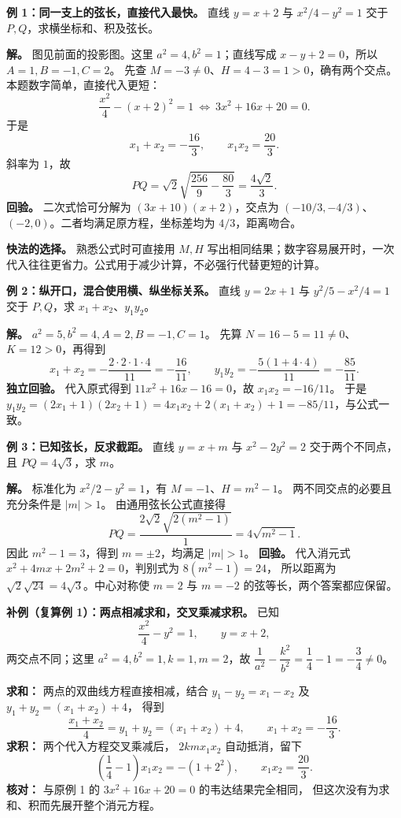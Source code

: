 \begin{examplebox}
\textbf{例 1：同一支上的弦长，直接代入最快。}
直线 $y=x+2$ 与 $x^2/4-y^2=1$ 交于 $P,Q$，求横坐标和、积及弦长。

\textbf{解。} 图见前面的投影图。这里 $a^2=4,b^2=1$；直线写成 $x-y+2=0$，所以 $A=1,B=-1,C=2$。
先查 $M=-3\ne0$、$H=4-3=1>0$，确有两个交点。
本题数字简单，直接代入更短：
\[
 \frac{x^2}{4}-(x+2)^2=1
 \ \Longleftrightarrow\ 3x^2+16x+20=0.
\]
于是
\[
 x_1+x_2=-\frac{16}{3},\qquad x_1x_2=\frac{20}{3}.
\]
斜率为 $1$，故
\[
 PQ=\sqrt2\sqrt{\frac{256}{9}-\frac{80}{3}}
 =\boxed{\frac{4\sqrt2}{3}}.
\]
\textbf{回验。} 二次式恰可分解为 $(3x+10)(x+2)$，交点为
$(-10/3,-4/3)$、$(-2,0)$。二者均满足原方程，坐标差均为 $4/3$，距离吻合。

\textbf{快法的选择。} 熟悉公式时可直接用 $M,H$ 写出相同结果；数字容易展开时，一次代入往往更省力。公式用于减少计算，不必强行代替更短的计算。
\end{examplebox}
\clearpage
\begin{examplebox}
\textbf{例 2：纵开口，混合使用横、纵坐标关系。}
直线 $y=2x+1$ 与 $y^2/5-x^2/4=1$ 交于 $P,Q$，求 $x_1+x_2$、$y_1y_2$。

\textbf{解。} $a^2=5,b^2=4,A=2,B=-1,C=1$。
先算 $N=16-5=11\ne0$、$K=12>0$，再得到
\[
 x_1+x_2=-\frac{2\cdot2\cdot1\cdot4}{11}=\boxed{-\frac{16}{11}},
\qquad y_1y_2=-\frac{5(1+4\cdot4)}{11}=\boxed{-\frac{85}{11}}.
\]
\textbf{独立回验。} 代入原式得到 $11x^2+16x-16=0$，故 $x_1x_2=-16/11$。
于是 $y_1y_2=(2x_1+1)(2x_2+1)=4x_1x_2+2(x_1+x_2)+1=-85/11$，与公式一致。
\end{examplebox}
\clearpage
\begin{examplebox}
\textbf{例 3：已知弦长，反求截距。}
直线 $y=x+m$ 与 $x^2-2y^2=2$ 交于两个不同点，且 $PQ=4\sqrt3$，求 $m$。

\textbf{解。} 标准化为 $x^2/2-y^2=1$，有 $M=-1$、$H=m^2-1$。
两不同交点的必要且充分条件是 $|m|>1$。
由通用弦长公式直接得
\[
 PQ=\frac{2\sqrt2\sqrt{2(m^2-1)}}1=4\sqrt{m^2-1}.
\]
因此 $m^2-1=3$，得到 $\boxed{m=\pm2}$，均满足 $|m|>1$。
\textbf{回验。} 代入消元式 $x^2+4mx+2m^2+2=0$，判别式为 $8(m^2-1)=24$，
所以距离为 $\sqrt2\sqrt{24}=4\sqrt3$。中心对称使 $m=2$ 与 $m=-2$ 的弦等长，两个答案都应保留。
\end{examplebox}
\clearpage
\begin{examplebox}
\textbf{补例（复算例 1）：两点相减求和，交叉乘减求积。}
已知
\[
 \frac{x^2}{4}-y^2=1,\qquad y=x+2,
\]
两交点不同；这里 $a^2=4,b^2=1,k=1,m=2$，故
$\dfrac1{a^2}-\dfrac{k^2}{b^2}=\dfrac14-1=-\dfrac34\ne0$。

\textbf{求和：} 两点的双曲线方程直接相减，结合
$y_1-y_2=x_1-x_2$ 及 $y_1+y_2=(x_1+x_2)+4$，
得到
\[
 \frac{x_1+x_2}{4}=y_1+y_2=(x_1+x_2)+4,
 \qquad \boxed{x_1+x_2=-\frac{16}{3}}.
\]
\textbf{求积：} 两个代入方程交叉乘减后，
$2kmx_1x_2$ 自动抵消，留下
\[
 \left(\frac14-1\right)x_1x_2=-(1+2^2),
 \qquad \boxed{x_1x_2=\frac{20}{3}}.
\]
\textbf{核对：} 与原例 1 的 $3x^2+16x+20=0$ 的韦达结果完全相同，
但这次没有为求和、积而先展开整个消元方程。
\end{examplebox}
\clearpage

